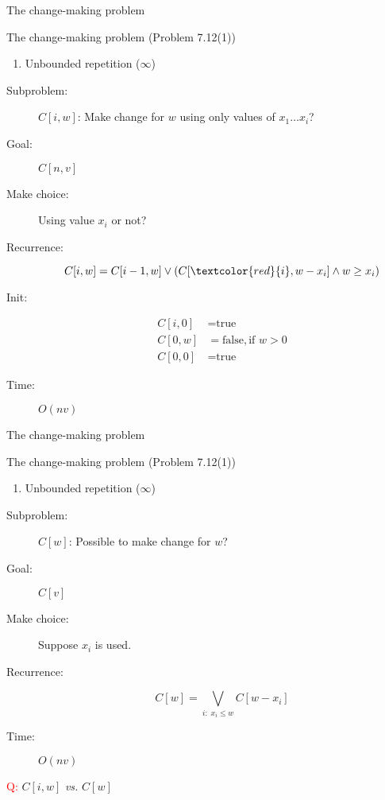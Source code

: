 \begin{frame}{The change-making problem}
  \begin{exampleblock}{The change-making problem (Problem 7.12(1))}
	\begin{enumerate}[(1)]
	  \item Unbounded repetition ($\infty$)
	\end{enumerate}
  \end{exampleblock}

  \pause
  \begin{description}
	\item[Subproblem:] $C[i, w]$: Make change for $w$ using only values of $x_{1} \dots x_{i}$?
	\item[Goal:] $C[n,v]$
	  \pause
	\item[Make choice:] Using value $x_{i}$ or not?
	\item[Recurrence:] 
	  \[
		C[i,w] = C[i-1, w] \lor (C[\textcolor{red}{i}, w-x_{i}] \land w \ge x_{i})
	  \]
	  \pause
	\item[Init:]
	  \begin{align*}
		C[i,0] &= \text{true}  \\
		C[0,w] &= \text{false}, \text{if } w > 0 \\
		C[0,0] &= \text{true}
	  \end{align*}
	\item[Time:] $O(nv)$
  \end{description}
\end{frame}
\begin{frame}{The change-making problem}
  \begin{exampleblock}{The change-making problem (Problem 7.12(1))}
	\begin{enumerate}[(1)]
	  \item Unbounded repetition ($\infty$)
	\end{enumerate}
  \end{exampleblock}

  \pause
  \begin{description}
	\item[Subproblem:] $C[w]$: Possible to make change for $w$?
	\item[Goal:] $C[v]$
	  \pause
	\item[Make choice:] Suppose $x_i$ is used.
	\item[Recurrence:] 
	  \[
		C[w] = \bigvee_{i: \; x_i \le w} C[w-x_i]
	  \]
	  \pause
	\item[Time:] $O(nv)$
  \end{description}

  \pause
  \centerline{\textcolor{red}{Q:} $C[i,w]$ \emph{vs.} $C[w]$}
\end{frame}
